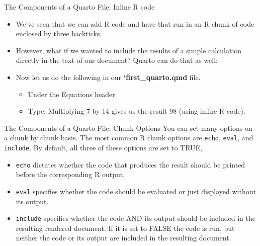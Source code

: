 \documentclass[
  ignorenonframetext,
]{beamer}
\providecommand{\tightlist}{%
  \setlength{\itemsep}{0pt}\setlength{\parskip}{0pt}}
\begin{document}
\begin{frame}{The Components of a Quarto File: Inline R code}
\label{the-components-of-a-quarto-file-inline-r-code}
\begin{itemize}
\item
  We've seen that we can add R code and have that run in an R chunk of
  code enclosed by three backticks.
\item
  However, what if we wanted to include the results of a simple
  calculation directly in the text of our document? Quarto can do that
  as well:
\item
  Now let us do the following in our \textbf{`first\_quarto.qmd} file.

  \begin{itemize}
  \tightlist
  \item
    Under the Equations header
  \item
    Type: Multiplying 7 by 14 gives us the result 98 (using inline R
    code).
  \end{itemize}
\end{itemize}
\end{frame}

\begin{frame}[fragile]{The Components of a Quarto File: Chunk Options}
\label{the-components-of-a-quarto-file-chunk-options}
You can set many options on a chunk by chunk basis. The most common R
chunk options are \texttt{echo}, \texttt{eval}, and \texttt{include}. By
default, all three of these options are set to TRUE,

\begin{itemize}
\item
  \texttt{echo} dictates whether the code that produces the result
  should be printed before the corresponding R output.
\item
  \texttt{eval} specifies whether the code should be evaluated or just
  displayed without its output.
\item
  \texttt{include} specifies whether the code AND its output should be
  included in the resulting rendered document. If it is set to FALSE the
  code is run, but neither the code or its output are included in the
  resulting document.
\end{itemize}
\end{frame}
\end{document}

